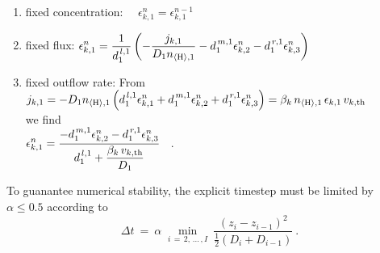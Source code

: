 \documentclass[11pt]{article}
\def\nHleft{n_{\langle\rm H\rangle,1}}
\begin{document}
\newpage
\begin{enumerate}
\item fixed concentration:
      ~~$\displaystyle\epsilon_{k,1}^{n} = \epsilon_{k,1}^{n-1}$
\item fixed flux:\hspace*{19.5mm}
      $\displaystyle\epsilon_{k,1}^{n} = \frac{1}{d^{\,l,1}_1}
       \left(-\frac{j_{k,1}}{D_1\nHleft} 
             -d^{\,m,1}_1\epsilon^n_{k,2} 
             -d^{\,r,1}_1\epsilon^n_{k,3}\right)$
\item fixed outflow rate: From
      ~~$j_{k,1} = \displaystyle -D_1\nHleft\left(
              d^{\,l,1}_1\epsilon_{k,1}^{n} 
             +d^{\,m,1}_1\epsilon^n_{k,2} 
             +d^{\,r,1}_1\epsilon^n_{k,3}\right)
      = \beta_k\,\nHleft\,\epsilon_{k,1}\,v_{k,\rm th}$\\
      we find\\
    \hspace*{37mm}$\displaystyle\epsilon_{k,1}^{n} = 
       \frac{-d^{\,m,1}_1\epsilon^n_{k,2} 
             -d^{\,r,1}_1\epsilon^n_{k,3}}
            {\displaystyle d^{\,l,1}_1+\frac{\beta_k\,v_{k,\rm th}}{D_1}}$
  \ .
\end{enumerate} 
To guanantee numerical stability, the explicit timestep must be 
limited by $\alpha\leq0.5$ according to
\begin{equation}
  \Delta t ~=~ \alpha\;\min_{i\,=\,2,\,...\,,I}~ 
               \frac{(z_i-z_{i-1})^2}{\frac{1}{2}(D_i+D_{i-1})} \ .
  \label{tstep}
\end{equation}
\end{document}
